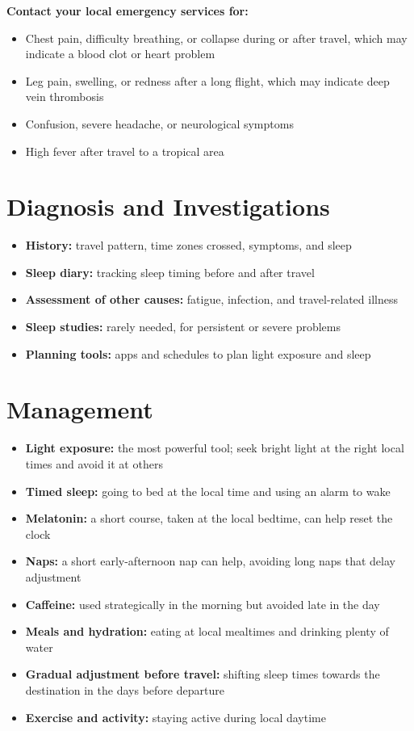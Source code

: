 \textbf{Contact your local emergency services for:}
\begin{itemize}
    \item Chest pain, difficulty breathing, or collapse during or after travel, which may indicate a blood clot or heart problem
    \item Leg pain, swelling, or redness after a long flight, which may indicate deep vein thrombosis
    \item Confusion, severe headache, or neurological symptoms
    \item High fever after travel to a tropical area
\end{itemize}

\section*{Diagnosis and Investigations}
\begin{itemize}
    \item \textbf{History:} travel pattern, time zones crossed, symptoms, and sleep
    \item \textbf{Sleep diary:} tracking sleep timing before and after travel
    \item \textbf{Assessment of other causes:} fatigue, infection, and travel-related illness
    \item \textbf{Sleep studies:} rarely needed, for persistent or severe problems
    \item \textbf{Planning tools:} apps and schedules to plan light exposure and sleep
\end{itemize}

\section*{Management}
\begin{itemize}
    \item \textbf{Light exposure:} the most powerful tool; seek bright light at the right local times and avoid it at others
    \item \textbf{Timed sleep:} going to bed at the local time and using an alarm to wake
    \item \textbf{Melatonin:} a short course, taken at the local bedtime, can help reset the clock
    \item \textbf{Naps:} a short early-afternoon nap can help, avoiding long naps that delay adjustment
    \item \textbf{Caffeine:} used strategically in the morning but avoided late in the day
    \item \textbf{Meals and hydration:} eating at local mealtimes and drinking plenty of water
    \item \textbf{Gradual adjustment before travel:} shifting sleep times towards the destination in the days before departure
    \item \textbf{Exercise and activity:} staying active during local daytime
\end{itemize}

